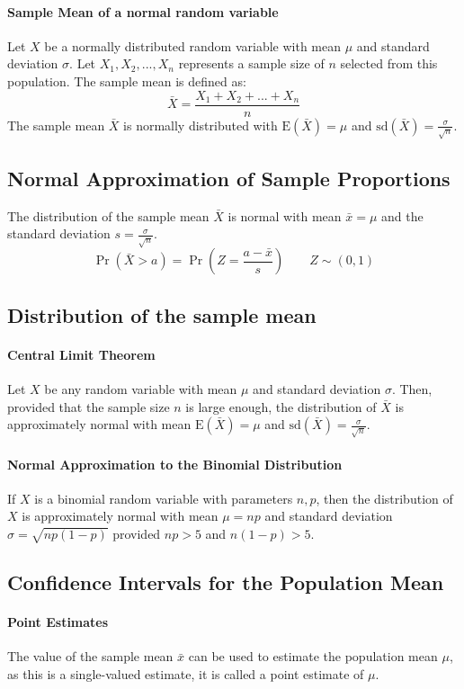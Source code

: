 \documentclass[a4paper,twoside]{article}
\begin{document}
			\paragraph{Sample Mean of a normal random variable} Let $X$ be a normally distributed random variable with mean $\mu$ and standard deviation $\sigma$. Let $X_1,X_2,...,X_n$ represents a sample size of $n$ selected from this population. The sample mean is defined as:
			\[
				\bar{X}=\frac{X_1+X_2+...+X_n}{n}
			\]
			The sample mean $\bar{X}$ is normally distributed with $\mathrm{E}(\bar{X})=\mu$ and $\mathrm{sd}(\bar{X})=\frac{\sigma}{\sqrt{n}}$.
				
		\subsection{Normal Approximation of Sample Proportions}
			The distribution of the sample mean $\bar{X}$ is normal with mean $\bar{x}=\mu$ and the standard deviation $s=\frac{\sigma}{\sqrt{n}}$.
			\[
				\Pr\left(\bar{X}>a\right)=\Pr\left(Z=\frac{a-\bar{x}}{s}\right) \qquad Z\sim(0,1)
			\]
			
		\subsection{Distribution of the sample mean}
			\paragraph{Central Limit Theorem} Let $X$ be any random variable with mean $\mu$ and standard deviation $\sigma$. Then, provided that the sample size $n$ is large enough, the distribution of $\bar{X}$ is approximately normal with mean $\mathrm{E}(\bar{X})=\mu$ and $\mathrm{sd}(\bar{X})=\frac{\sigma}{\sqrt{n}}$.
			
			\paragraph{Normal Approximation to the Binomial Distribution} If $X$ is a binomial random variable with parameters $n,p$, then the distribution of $X$ is approximately normal with mean $\mu=np$ and standard deviation $\sigma=\sqrt{np(1-p)}$ provided $np>5$ and $n(1-p)>5$.
			
		\subsection{Confidence Intervals for the Population Mean}
			\paragraph{Point Estimates} The value of the sample mean $\bar{x}$ can be used to estimate the population mean $\mu$, as this is a single-valued estimate, it is called a point estimate of $\mu$.
			
\end{document}
